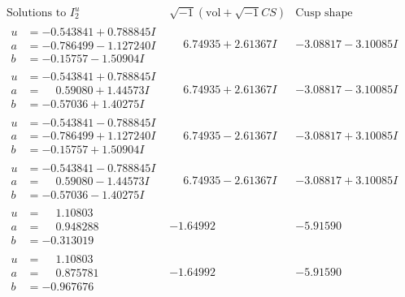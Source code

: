 \documentclass[1p]{elsarticle_modified}
\theoremstyle{definition}
\newcommand{\I}{\sqrt{-1}}
\begin{document}
$$\begin{array}{c|c|c}  
\text{Solutions to }I^u_{2}& \I (\text{vol} + \sqrt{-1}CS) & \text{Cusp shape}\\
 \hline 
\begin{aligned}
u &= -0.543841 + 0.788845 I \\
a &= -0.786499 - 1.127240 I \\
b &= -0.15757 - 1.50904 I\end{aligned}
 & \phantom{-}6.74935 + 2.61367 I & -3.08817 - 3.10085 I \\ \hline\begin{aligned}
u &= -0.543841 + 0.788845 I \\
a &= \phantom{-}0.59080 + 1.44573 I \\
b &= -0.57036 + 1.40275 I\end{aligned}
 & \phantom{-}6.74935 + 2.61367 I & -3.08817 - 3.10085 I \\ \hline\begin{aligned}
u &= -0.543841 - 0.788845 I \\
a &= -0.786499 + 1.127240 I \\
b &= -0.15757 + 1.50904 I\end{aligned}
 & \phantom{-}6.74935 - 2.61367 I & -3.08817 + 3.10085 I \\ \hline\begin{aligned}
u &= -0.543841 - 0.788845 I \\
a &= \phantom{-}0.59080 - 1.44573 I \\
b &= -0.57036 - 1.40275 I\end{aligned}
 & \phantom{-}6.74935 - 2.61367 I & -3.08817 + 3.10085 I \\ \hline\begin{aligned}
u &= \phantom{-}1.10803\phantom{ +0.000000I} \\
a &= \phantom{-}0.948288\phantom{ +0.000000I} \\
b &= -0.313019\phantom{ +0.000000I}\end{aligned}
 & -1.64992\phantom{ +0.000000I} & -5.91590\phantom{ +0.000000I} \\ \hline\begin{aligned}
u &= \phantom{-}1.10803\phantom{ +0.000000I} \\
a &= \phantom{-}0.875781\phantom{ +0.000000I} \\
b &= -0.967676\phantom{ +0.000000I}\end{aligned}
 & -1.64992\phantom{ +0.000000I} & -5.91590\phantom{ +0.000000I} \\ \hline\begin{aligned}

\end{aligned}
\end{array}$$
\end{document}

